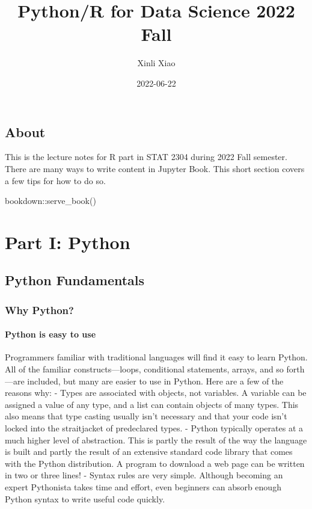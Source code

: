 \documentclass[
]{book}
\title{Python/R for Data Science 2022 Fall}
\author{Xinli Xiao}
\date{2022-06-22}
\newenvironment{Shaded}{\begin{snugshade}}{\end{snugshade}}
\newcommand{\FunctionTok}[1]{\textcolor[rgb]{0.00,0.00,0.00}{#1}}
\newcommand{\NormalTok}[1]{#1}
\newcommand{\SpecialCharTok}[1]{\textcolor[rgb]{0.00,0.00,0.00}{#1}}
\begin{document}
\maketitle

{
\setcounter{tocdepth}{1}
\tableofcontents
}
\hypertarget{about}{%
\chapter{About}\label{about}}

This is the lecture notes for R part in STAT 2304 during 2022 Fall semester.
There are many ways to write content in Jupyter Book. This short section
covers a few tips for how to do so.

\begin{Shaded}
\begin{Highlighting}[]
\NormalTok{bookdown}\SpecialCharTok{::}\FunctionTok{serve\_book}\NormalTok{()}
\end{Highlighting}
\end{Shaded}

\hypertarget{part-part-i-python}{%
\part*{Part I: Python}\label{part-part-i-python}}

\hypertarget{python-fundamentals}{%
\chapter{Python Fundamentals}\label{python-fundamentals}}

\hypertarget{why-python}{%
\section{Why Python?}\label{why-python}}

\hypertarget{python-is-easy-to-use}{%
\subsection{Python is easy to use}\label{python-is-easy-to-use}}

Programmers familiar with traditional languages will find it easy to learn Python. All of the familiar constructs---loops, conditional statements, arrays, and so forth---are included, but many are easier to use in Python. Here are a few of the reasons why:
- Types are associated with objects, not variables. A variable can be assigned a value of any type, and a list can contain objects of many types. This also means that type casting usually isn't necessary and that your code isn't locked into the straitjacket of predeclared types.
- Python typically operates at a much higher level of abstraction. This is partly the result of the way the language is built and partly the result of an extensive standard code library that comes with the Python distribution. A program to download a web page can be written in two or three lines!
- Syntax rules are very simple. Although becoming an expert Pythonista takes time
and effort, even beginners can absorb enough Python syntax to write useful
code quickly.
\end{document}
